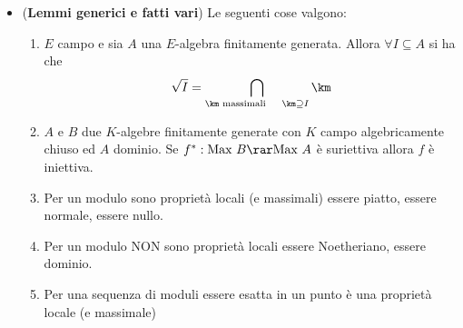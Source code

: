 \documentclass[a4paper,NoNotes,GeneralMath]{stdmdoc}
\newcommand{\Max}{\text{Max }}
\begin{document}
\begin{itemize}
\item ({\bf Lemmi generici e fatti vari}) Le seguenti cose valgono:
  \begin{enumerate}
  \item $E$ campo e sia $A$ una $E$-algebra finitamente generata. Allora
    $\forall I \subseteq A$ si ha che
    $$\sqrt{I} = \bigcap_{\km \text{ massimali } \quad \km \supseteq I} \km$$
  \item $A$ e $B$ due $K$-algebre finitamente generate con $K$ campo
    algebricamente chiuso ed $A$ dominio. Se $f^*: \Max B \rar \Max A$ è
    suriettiva allora $f$ è iniettiva.
  \item Per un modulo sono proprietà locali (e massimali) essere
    piatto, essere normale, essere nullo.
  \item Per un modulo NON sono proprietà locali essere Noetheriano,
    essere dominio.
  \item Per una sequenza di moduli essere esatta in un punto è una
    proprietà locale (e massimale)
  \end{enumerate}
\end{itemize}
\end{document}
